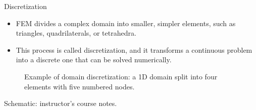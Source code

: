 \documentclass[aspectratio=169,11pt]{beamer}
\begin{document}
\begin{frame}{Discretization}
    \begin{itemize}
        \item FEM divides a complex domain into smaller, simpler elements, such as triangles, quadrilaterals, or tetrahedra.
        \item This process is called discretization, and it transforms a continuous problem into a discrete one that can be solved numerically.
    \end{itemize}
    \begin{figure}
        \centering
        \caption{Example of domain discretization: a 1D domain split into four elements with five numbered nodes.}
    \end{figure}
    \vspace{-3mm}
    {\centering\tiny\color{DarkGray}Schematic: instructor's course notes.\par}
\end{frame}
\end{document}
